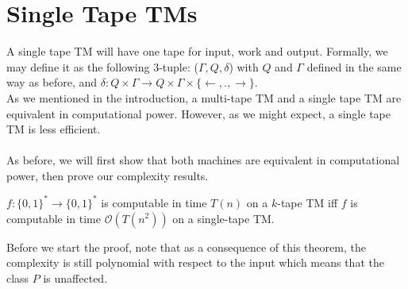 \documentclass[usletter]{article}
\begin{document}
\section{Single Tape TMs}
A single tape TM will have one tape for input, work and output. Formally, we may define it as the following $3$-tuple: ($\Gamma, Q, \delta$) with $Q$ and $\Gamma$ defined in the same way as before, and $\delta: Q \times \Gamma \rightarrow Q \times \Gamma \times \{\leftarrow, . , \rightarrow \}$. 
\\
As we mentioned in the introduction, a multi-tape TM and a single tape TM are equivalent in computational power. However, as we might expect, a single tape TM is less efficient.
\\\\
As before, we will first show that both machines are equivalent in computational power, then prove our complexity results. 
\begin{theorem}
$f : \{0, 1\}^* \rightarrow \{0, 1\}^*$ is computable in time $T(n)$ on a $k$-tape TM iff $f$ is computable in time $\mathcal{O}(T(n^2))$ on a single-tape TM.
\end{theorem}
\noindent
Before we start the proof, note that as a consequence of this theorem, the complexity is still polynomial with respect to the input which means that the class $P$ is unaffected.
\end{document}
